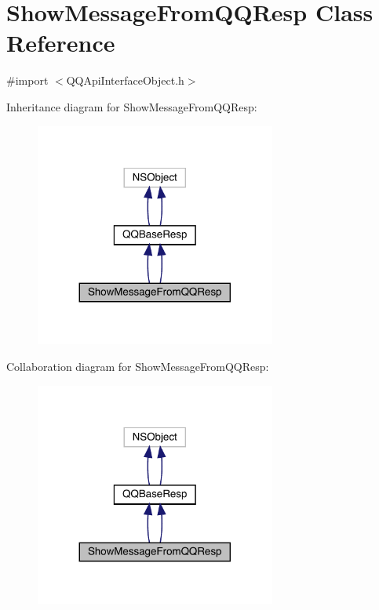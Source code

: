 \hypertarget{interface_show_message_from_q_q_resp}{}\section{Show\+Message\+From\+Q\+Q\+Resp Class Reference}
\label{interface_show_message_from_q_q_resp}


{\ttfamily \#import $<$Q\+Q\+Api\+Interface\+Object.\+h$>$}



Inheritance diagram for Show\+Message\+From\+Q\+Q\+Resp\+:\nopagebreak
\begin{figure}[H]
\begin{center}
\leavevmode
\includegraphics[width=224pt]{interface_show_message_from_q_q_resp__inherit__graph}
\end{center}
\end{figure}


Collaboration diagram for Show\+Message\+From\+Q\+Q\+Resp\+:\nopagebreak
\begin{figure}[H]
\begin{center}
\leavevmode
\includegraphics[width=224pt]{interface_show_message_from_q_q_resp__coll__graph}
\end{center}
\end{figure}
